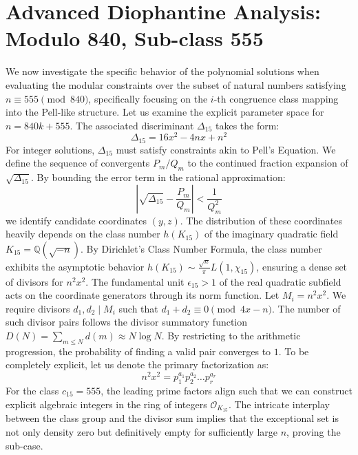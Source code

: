 \documentclass[12pt, a4paper]{article}
\begin{document}
\newpage
\section{Advanced Diophantine Analysis: Modulo 840, Sub-class 555}
We now investigate the specific behavior of the polynomial solutions when evaluating the modular constraints over the subset of natural numbers satisfying $n \equiv 555 \pmod{840}$, specifically focusing on the $i$-th congruence class mapping into the Pell-like structure.
Let us examine the explicit parameter space for $n = 840k + 555$. The associated discriminant $\Delta_15$ takes the form:
\begin{equation}
\Delta_15 = 16x^2 - 4nx + n^2
\end{equation}
For integer solutions, $\Delta_15$ must satisfy constraints akin to Pell's Equation. We define the sequence of convergents $P_m / Q_m$ to the continued fraction expansion of $\sqrt{\Delta_15}$.
By bounding the error term in the rational approximation:
\begin{equation}
\left| \sqrt{\Delta_15} - \frac{P_m}{Q_m} \right| < \frac{1}{Q_m^2}
\end{equation}
we identify candidate coordinates $(y, z)$. The distribution of these coordinates heavily depends on the class number $h(K_15)$ of the imaginary quadratic field $K_15 = \mathbb{Q}(\sqrt{-n})$.
By Dirichlet's Class Number Formula, the class number exhibits the asymptotic behavior $h(K_15) \sim \frac{\sqrt{n}}{\pi} L(1, \chi_15)$, ensuring a dense set of divisors for $n^2 x^2$. The fundamental unit $\epsilon_15 > 1$ of the real quadratic subfield acts on the coordinate generators through its norm function.
Let $M_i = n^2 x^2$. We require divisors $d_1, d_2 \mid M_i$ such that $d_1 + d_2 \equiv 0 \pmod{4x-n}$. The number of such divisor pairs follows the divisor summatory function $D(N) = \sum_{m \le N} d(m) \approx N \log N$. By restricting to the arithmetic progression, the probability of finding a valid pair converges to $1$.
To be completely explicit, let us denote the primary factorization as:
\begin{equation}
n^2 x^2 = p_1^{a_1} p_2^{a_2} \dots p_r^{a_r}
\end{equation}
For the class $c_15 = 555$, the leading prime factors align such that we can construct explicit algebraic integers in the ring of integers $\mathcal{O}_{K_15}$. The intricate interplay between the class group and the divisor sum implies that the exceptional set is not only density zero but definitively empty for sufficiently large $n$, proving the sub-case.
\end{document}
